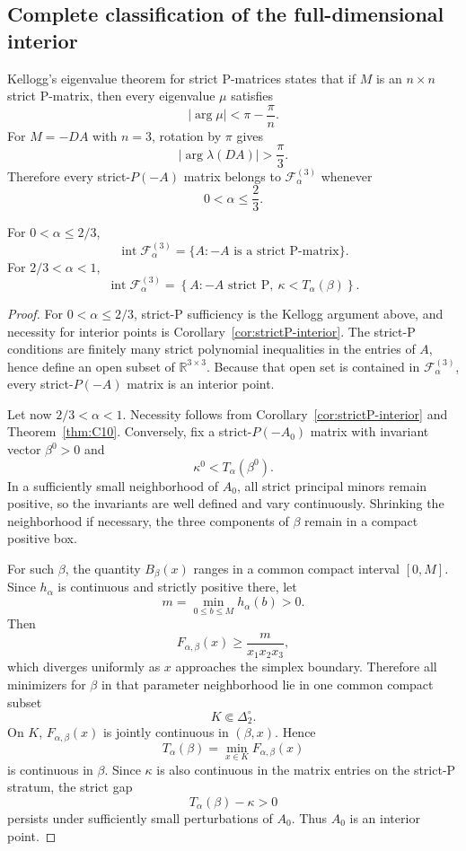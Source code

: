 \subsection{Complete classification of the full-dimensional interior}

Kellogg's eigenvalue theorem for strict P-matrices \citep{Kellogg1972} states that if \(M\) is an \(n\times n\) strict P-matrix, then every eigenvalue \(\mu\) satisfies
\[
|\arg\mu|
<
\pi-\frac{\pi}{n}.
\]
For \(M=-DA\) with \(n=3\), rotation by \(\pi\) gives
\[
|\arg\lambda(DA)|
>
\frac{\pi}{3}.
\]
Therefore every strict-\(P(-A)\) matrix belongs to \(\mathcal F_\alpha^{(3)}\) whenever
\[
0<\alpha\le\frac23.
\]

\begin{theorem}
\label{thm:interior-F}
For \(0<\alpha\le2/3\),
\[
\boxed{
\operatorname{int}\mathcal F_\alpha^{(3)}
=
\{A:-A\text{ is a strict P-matrix}\}.
}
\]
For \(2/3<\alpha<1\),
\[
\boxed{
\operatorname{int}\mathcal F_\alpha^{(3)}
=
\left\{
A:
-A\text{ strict P},
\ \kappa<T_\alpha(\beta)
\right\}.
}
\]
\end{theorem}

\begin{proof}
For \(0<\alpha\le2/3\), strict-P sufficiency is the Kellogg argument above, and necessity for interior points is Corollary~\ref{cor:strictP-interior}. The strict-P conditions are finitely many strict polynomial inequalities in the entries of \(A\), hence define an open subset of \(\mathbb R^{3\times3}\). Because that open set is contained in \(\mathcal F_\alpha^{(3)}\), every strict-\(P(-A)\) matrix is an interior point.

Let now \(2/3<\alpha<1\). Necessity follows from Corollary~\ref{cor:strictP-interior} and Theorem~\ref{thm:C10}. Conversely, fix a strict-\(P(-A_0)\) matrix with invariant vector \(\beta^0>0\) and
\[
\kappa^0<T_\alpha(\beta^0).
\]
In a sufficiently small neighborhood of \(A_0\), all strict principal minors remain positive, so the invariants are well defined and vary continuously. Shrinking the neighborhood if necessary, the three components of \(\beta\) remain in a compact positive box.

For such \(\beta\), the quantity \(B_\beta(x)\) ranges in a common compact interval \([0,M]\). Since \(h_\alpha\) is continuous and strictly positive there, let
\[
m=\min_{0\le b\le M}h_\alpha(b)>0.
\]
Then
\[
F_{\alpha,\beta}(x)
\ge
\frac{m}{x_1x_2x_3},
\]
which diverges uniformly as \(x\) approaches the simplex boundary. Therefore all minimizers for \(\beta\) in that parameter neighborhood lie in one common compact subset
\[
K\Subset\Delta_2^\circ.
\]
On \(K\), \(F_{\alpha,\beta}(x)\) is jointly continuous in \((\beta,x)\). Hence
\[
T_\alpha(\beta)=\min_{x\in K}F_{\alpha,\beta}(x)
\]
is continuous in \(\beta\). Since \(\kappa\) is also continuous in the matrix entries on the strict-P stratum, the strict gap
\[
T_\alpha(\beta)-\kappa>0
\]
persists under sufficiently small perturbations of \(A_0\). Thus \(A_0\) is an interior point.
\end{proof}

